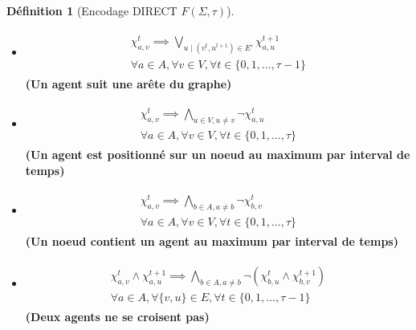 \documentclass[french, 12pt, letterpaper]{article}
\theoremstyle{definition}
\newtheorem{definition}{Définition}[subsection]
\theoremstyle{proposition}
\theoremstyle{example}
\begin{document}
\begin{definition}[Encodage DIRECT $F(\Sigma, \tau)$]
        \begin{itemize}
            \item[] 
                \begin{gather}
                    \begin{split}
                        \chi_{a, v}^t \implies \bigvee_{u\;|\;( v^t, u^{t+1} ) \in E'} \chi_{a, u}^{t+1}
                        \\\forall a \in A, \forall v \in V, \forall t \in \{0, 1, \ldots, \tau-1\}
                    \end{split}
                \end{gather}
                \textbf{(Un agent suit une arête du graphe)}
            \item[] 
                \begin{gather}
                    \begin{split}
                        \chi_{a, v}^t \implies \bigwedge_{u \in V, u \neq v} \lnot \chi_{a, u}^t
                        \\\forall a \in A, \forall v \in V, \forall t \in \{0, 1, \ldots, \tau\}
                    \end{split}
                \end{gather}
                \textbf{(Un agent est positionné sur un noeud au maximum par interval de temps)}
            \item[] 
                \begin{gather}
                    \begin{split}
                        \chi_{a, v}^t \implies \bigwedge_{b \in A, a \neq b} \lnot \chi_{b, v}^t
                        \\\forall a \in A, \forall v \in V, \forall t \in \{0, 1, \ldots, \tau\}
                    \end{split}
                \end{gather}
                \textbf{(Un noeud contient un agent au maximum par interval de temps)}
            \item[] 
                \begin{gather}
                    \begin{split}
                        \chi_{a, v}^t \land \chi_{a, u}^{t+1} \implies \bigwedge_{b \in A, a \neq b} \lnot (\chi_{b, u}^t \land \chi_{b, v}^{t+1})
                        \\\forall a \in A, \forall \{v, u\} \in E, \forall t \in \{0, 1, \ldots, \tau-1\}
                    \end{split}
                \end{gather}
                \textbf{(Deux agents ne se croisent pas)}
        \end{itemize}
    \end{definition}
\end{document}
